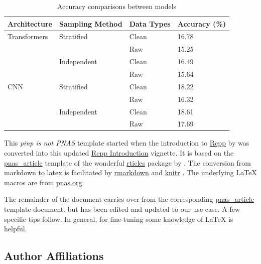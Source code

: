 \documentclass[letterpaper,9pt,twocolumn,twoside,]{pinp}
\begin{document}
\begin{table}[h]
\begin{tabular}{l|l|l|l}
Architecture & Sampling Method & Data Types & Accuracy (\%) \\ \hline
Transformers & Stratified      & Clean      & 16.78         \\ \cline{3-4} 
             &                 & Raw        & 15.25         \\ \cline{2-4} 
             & Independent     & Clean      & 16.49         \\ \cline{3-4} 
             &                 & Raw        & 15.64         \\ \hline
CNN          & Stratified      & Clean      & 18.22         \\ \cline{3-4} 
             &                 & Raw        & 16.32         \\ \cline{2-4} 
             & Independent     & Clean      & 18.61         \\ \cline{3-4}
             &                 & Raw        & 17.69        
\end{tabular}
\caption{\label{tab:acc_table} Accuracy comparisons between models}
\end{table}

This \emph{pinp is not PNAS} template started when the introduction to
\href{http://dirk.eddelbuettel.com/code/rcpp.html}{Rcpp} by
\cite{PeerJ:Rcpp} was converted into this updated
\href{https://eddelbuettel.github.io/pinp/Rcpp-introduction.pdf}{Rcpp
Introduction} vignette. It is based on the
\href{https://github.com/rstudio/rticles/tree/master/inst/rmarkdown/templates/pnas_article}{pnas\_article}
template of the wonderful
\href{https://cran.r-project.org/package=rticles}{rticles} package by
\cite{CRAN:rticles}. The conversion from markdown to latex is
facilitated by
\href{https://cran.r-project.org/package=rmarkdown}{rmarkdown}
\citep{CRAN:rmarkdown} and
\href{https://cran.r-project.org/package=knitr}{knitr}
\citep{CRAN:knitr}. The underlying LaTeX macros are from
\href{http://www.pnas.org/site/authors/latex.xhtml}{pnas.org}.

The remainder of the document carries over from the corresponding
\href{https://github.com/rstudio/rticles/tree/master/inst/rmarkdown/templates/pnas_article}{pnas\_article}
template document. but has been edited and updated to our use case. A
few specific tips follow. In general, for fine-tuning some knowledge of
LaTeX is helpful.

\hypertarget{author-affiliations}{%
\subsection{Author Affiliations}\label{author-affiliations}}
\end{document}
